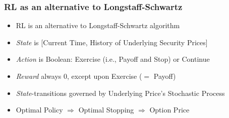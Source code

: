 \documentclass{beamer}
\begin{document}
\begin{frame}
\frametitle{RL as an alternative to Longstaff-Schwartz}
\begin{itemize}
\item RL is an alternative to Longstaff-Schwartz algorithm
\item {\em State} is [Current Time, History of Underlying Security Prices]
\item {\em Action} is Boolean: Exercise (i.e., Payoff and Stop) or Continue
\item {\em Reward} always 0, except upon Exercise ($=$ Payoff)
\item {\em State}-transitions governed by Underlying Price's Stochastic Process
\item Optimal Policy $\Rightarrow$ Optimal Stopping $\Rightarrow$ Option Price
\end{itemize}
\end{frame}
\end{document}
